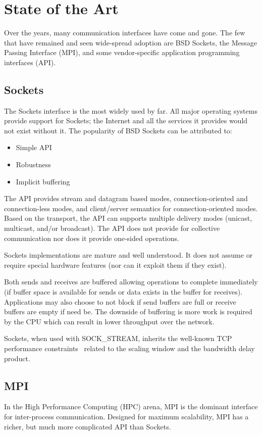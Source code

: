 \section{State of the Art}
\label{sec:state}
Over the years, many communication interfaces have come and gone. The few that have
remained and seen wide-spread adoption are BSD Sockets\cite{Sechrest:CSD-84-191}, the Message Passing
Interface (MPI)\cite{mpi_forum93:_mpi}, and some vendor-specific application programming interfaces
(API).

\subsection{Sockets} The Sockets interface is the most widely used by far. All major
operating systems provide support for Sockets; the Internet and all the services it
provides would not exist without it. The popularity of BSD Sockets can be attributed to:

\begin{itemize}
\item Simple API
\item Robustness
\item Implicit buffering
\end{itemize}

The API provides stream and datagram based modes, connection-oriented and connection-less
modes, and client/server semantics for connection-oriented modes. Based on the transport,
the API can supports multiple delivery modes (unicast, multicast, and/or broadcast). The
API does not provide for collective communication nor does it provide one-sided
operations.

Sockets implementations are mature and well understood. It does not assume or require
special hardware features (nor can it exploit them if they exist).

Both sends and receives are buffered allowing operations to complete immediately (if buffer
space is available for sends or data exists in the buffer for receives). Applications may
also choose to not block if send buffers are full or receive buffers are empty if need be.
The downside of buffering is more work is required by the CPU which can result in lower
throughput over the network.

Sockets, when used with SOCK\_STREAM, inherits the well-known TCP
performance constraints~\cite{Foong03tcpperformance} related to the
scaling window and the bandwidth delay product. 

\subsection{MPI}\label{sec:mpi} In the High Performance Computing (HPC) arena, MPI is the dominant
interface for inter-process communication. Designed for maximum scalability, MPI has a
richer, but much more complicated API than Sockets.

